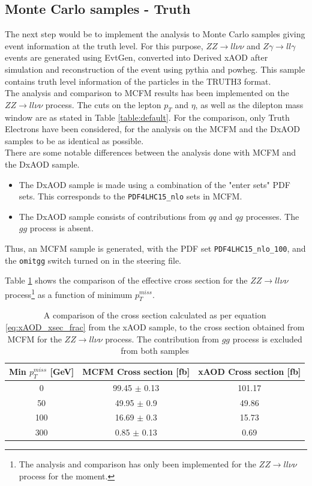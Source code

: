 \documentclass[11pt,a4paper,final]{report}
\newcommand{\ZZ}{$ZZ\rightarrow ll\nu\nu$ }
\begin{document}
\subsection*{Monte Carlo samples - Truth}
\label{subsec:MC_truth}
The next step would be to implement the analysis to Monte Carlo samples giving event information at the truth level. For this purpose, $ZZ\rightarrow ll\nu\nu$ and $Z\gamma \rightarrow ll\gamma$ events are generated using EvtGen, converted into Derived xAOD after simulation and reconstruction of the event using pythia and powheg. This sample contains truth level information of the particles in the TRUTH3 format.\\
The analysis and comparison to MCFM results has been implemented on the \ZZ process. The cuts on the lepton $p_T$ and $\eta$, as well as the dilepton mass window are as stated in Table \ref{table:default}. For the comparison, only Truth Electrons have been considered, for the analysis on the MCFM and the DxAOD samples to be as identical as possible.\\
There are some notable differences between the analysis done with MCFM and the DxAOD sample.
\begin{itemize}
	\item The DxAOD sample is made using a combination of the "enter sets" PDF sets. This corresponds to the \texttt{PDF4LHC15\_nlo} sets in MCFM.
	\item The DxAOD sample consists of contributions from $qq$ and $qg$ processes. The $gg$ process is absent.
\end{itemize}
Thus, an MCFM sample is generated, with the PDF set \texttt{PDF4LHC15\_nlo\_100}, and the \texttt{omitgg} switch turned on in the steering file.

Table \ref{table:xAOD_MCFM_compare} shows the comparison of the effective cross section for the \ZZ process\footnote{The analysis and comparison has only been implemented for the \ZZ process for the moment.} as a function of minimum $p_T^{miss}$.

\begin{table}[H]
	\centering
	\begin{tabular}{|c|c|c|}
	\hline
	Min $p_T^{miss}$ [GeV] & MCFM Cross section [fb] & xAOD Cross section [fb]\\
	\hline
	0 & 99.45 $\pm$ 0.13 & 101.17\\
	50 & 49.95 $\pm$ 0.9 & 49.86\\
	100 & 16.69 $\pm$ 0.3 & 15.73\\
	300 & 0.85 $\pm$ 0.13 & 0.69\\
	\hline
	\end{tabular}
	\caption{A comparison of the cross section calculated as per equation \ref{eq:xAOD_xsec_frac} from the xAOD sample, to the cross section obtained from MCFM for the \ZZ process. The contribution from $gg$ process is excluded from both samples}
	\label{table:xAOD_MCFM_compare}
\end{table}
\end{document}
